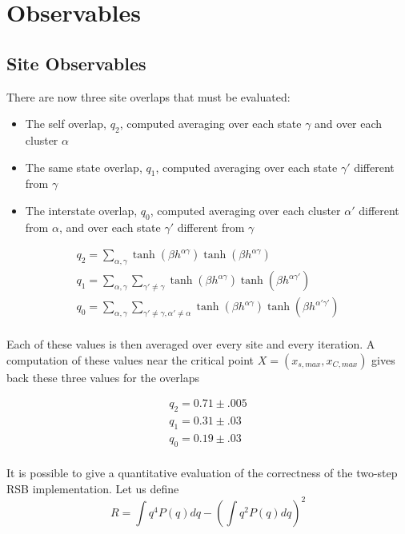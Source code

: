 \section{Observables}

\subsection{Site Observables}

There are now three site overlaps that must be evaluated:
\begin{itemize}

\item{The self overlap, $q_2$, computed averaging over each state $\gamma$ and over each cluster $\alpha$}
\item{The same state overlap, $q_1$, computed averaging over each state $\gamma'$ different from $\gamma$}
\item{The interstate overlap, $q_0$, computed averaging over each cluster $\alpha'$ different from $\alpha$, and over each state $\gamma'$ different from $\gamma$}

\end{itemize}

\begin{eqnarray}
	q_2 = \sum_{\alpha, \gamma } \tanh(\beta h^{\alpha\gamma})\tanh(\beta h^{\alpha\gamma})  \\
	q_1 = \sum_{\alpha, \gamma} \sum_{\gamma' \neq \gamma } \tanh(\beta h^{\alpha\gamma})\tanh(\beta h^{\alpha\gamma'})  \\
	q_0 = \sum_{\alpha, \gamma} \sum_{\gamma' \neq \gamma, \alpha' \neq \alpha} \tanh(\beta h^{\alpha\gamma})\tanh(\beta h^{\alpha'\gamma'})  \\
\end{eqnarray}

Each of these values is then averaged over every site and every iteration.
A computation of these values near the critical point $X = (x_{s,max},x_{C,max})$ gives back these three values for the overlaps

\begin{eqnarray}
	q_2 = 0.71 \pm .005\nonumber \\
	q_1 = 0.31 \pm .03 \nonumber \\
	q_0 = 0.19 \pm .03 \nonumber \\
\end{eqnarray}

It is possible to give a quantitative evaluation of the correctness of the two-step RSB implementation. Let us define
\begin{equation}
R = \int q^4 P(q)dq - (\int q^2P(q)dq)^2
\label{erre}
\end{equation}

